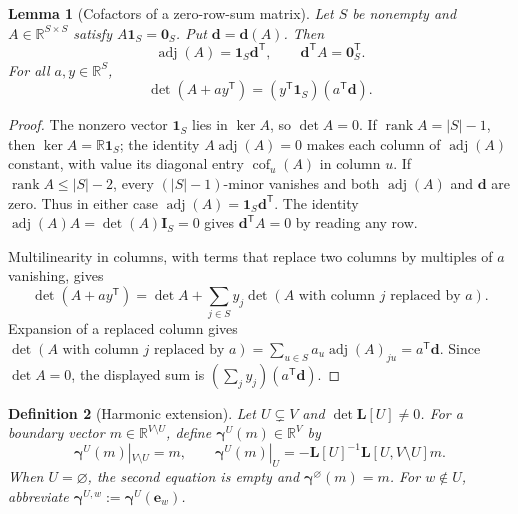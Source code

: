 \documentclass[11pt]{article}
\newtheorem{definition}{Definition}[section]
\newtheorem{lemma}[definition]{Lemma}
\newcommand{\R}{\mathbb R}
\newcommand{\one}{\mathbf 1}
\newcommand{\zero}{\mathbf 0}
\newcommand{\Id}{\mathbf I}
\newcommand{\Lmat}{\mathbf L}
\newcommand{\gam}{\boldsymbol\gamma}
\newcommand{\cof}{\operatorname{cof}}
\newcommand{\adj}{\operatorname{adj}}
\newcommand{\rank}{\operatorname{rank}}
\begin{document}
\begin{lemma}[Cofactors of a zero-row-sum matrix]\label{lem:cofactor}
Let $S$ be nonempty and $A\in\R^{S\times S}$ satisfy
$A\one_S=\zero_S$. Put $\mathbf d=\mathbf d(A)$. Then
\[
\adj(A)=\one_S\mathbf d^{\mathsf T},\qquad
\mathbf d^{\mathsf T}A=\zero_S^{\mathsf T}.
\]
For all $a,y\in\R^S$,
\begin{equation}\label{eq:cofactor-rank-one}
\det(A+ay^{\mathsf T})
= (y^{\mathsf T}\one_S)(a^{\mathsf T}\mathbf d).
\end{equation}
\end{lemma}
\begin{proof}
The nonzero vector $\one_S$ lies in $\ker A$, so $\det A=0$.
If $\rank A=|S|-1$, then $\ker A=\R\one_S$; the identity
$A\adj(A)=0$ makes each column of $\adj(A)$ constant, with value
its diagonal entry $\cof_u(A)$ in column $u$. If
$\rank A\leq |S|-2$, every $(|S|-1)$-minor vanishes and both
$\adj(A)$ and $\mathbf d$ are zero. Thus in either case
$\adj(A)=\one_S\mathbf d^{\mathsf T}$. The identity
$\adj(A)A=\det(A)\Id_S=0$ gives
$\mathbf d^{\mathsf T}A=0$ by reading any row.

Multilinearity in columns, with terms that replace two columns by
multiples of $a$ vanishing, gives
\[
\det(A+ay^{\mathsf T})
=\det A+\sum_{j\in S}y_j\det(A\text{ with column }j
\text{ replaced by }a).
\]
Expansion of a replaced column gives
$\det(A\text{ with column }j\text{ replaced by }a)
=\sum_{u\in S}a_u\adj(A)_{ju}=a^{\mathsf T}\mathbf d$.
Since $\det A=0$, the displayed sum is
$(\sum_jy_j)(a^{\mathsf T}\mathbf d)$.
\end{proof}

\begin{definition}[Harmonic extension]\label{def:harmonic}
Let $U\subsetneq V$ and $\det\Lmat[U]\neq0$. For a boundary vector
$m\in\R^{V\setminus U}$, define $\gam^U(m)\in\R^V$ by
\begin{equation}\label{eq:harmonic}
\gam^U(m)|_{V\setminus U}=m,
\qquad
\gam^U(m)|_U
=-\Lmat[U]^{-1}\Lmat[U,V\setminus U]m.
\end{equation}
When $U=\varnothing$, the second equation is empty and
$\gam^\varnothing(m)=m$. For $w\notin U$, abbreviate
$\gam^{U,w}:=\gam^U(\mathbf e_w)$.
\end{definition}
\end{document}
